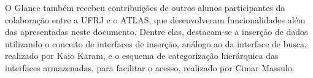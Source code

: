 O Glance também recebeu contribuições de outros alunos participantes da
colaboração entre a UFRJ e o ATLAS, que desenvolveram funcionalidades além das
apresentadas neste documento.
%
Dentre elas, destacam-se a inserção de dados utilizando o conceito de interfaces
de inserção, análogo ao da interface de busca, realizado por Kaio Karam, e o
esquema de categorização hierárquica das interfaces armazenadas, para facilitar
o acesso, realizado por Cimar Massulo.
